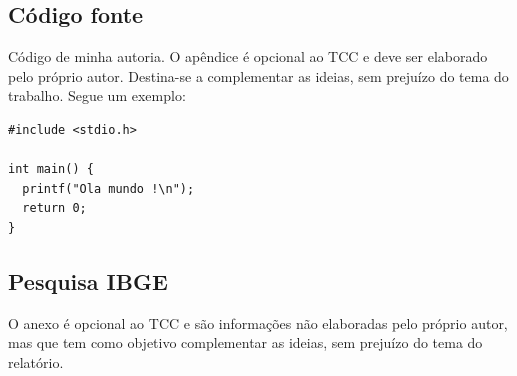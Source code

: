 \documentclass[
	12pt,				%
	openright,			%
	oneside,			%
	a4paper,			%
	chapter=TITLE,		%
	section=TITLE,		%
	english,			%
	french,				%
	spanish,			%
	brazil				%
	]{abntex2}
\begin{document}

\begin{apendicesenv}

\chapter{Código fonte}
Código de minha autoria. O apêndice é opcional ao TCC e deve ser elaborado pelo próprio autor. Destina-se a complementar as ideias, sem prejuízo do tema do trabalho. Segue um exemplo:

\scriptsize
\begin{lstlisting}
#include <stdio.h>

int main() {
  printf("Ola mundo !\n");
  return 0;
}
\end{lstlisting}

\end{apendicesenv}

\begin{anexosenv}

\chapter{Pesquisa IBGE}
O anexo é opcional ao TCC e são informações não elaboradas pelo próprio autor, mas que tem como objetivo complementar as ideias, sem prejuízo do tema do relatório.

\end{anexosenv}

\label{nropaginas}


\printindex
\end{document}
